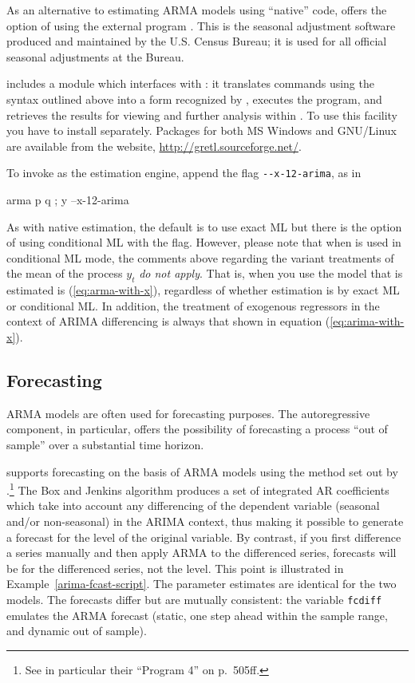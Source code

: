 As an alternative to estimating ARMA models using ``native'' code,
 offers the option of using the external program
.  This is the seasonal adjustment software produced
and maintained by the U.S. Census Bureau; it is used for all official
seasonal adjustments at the Bureau.

 includes a module which interfaces with :
it translates  commands using the syntax outlined above into
a form recognized by , executes the program, and
retrieves the results for viewing and further analysis within
.  To use this facility you have to install
 separately.  Packages for both MS Windows and
GNU/Linux are available from the  website,
\url{http://gretl.sourceforge.net/}.

To invoke  as the estimation engine, append the flag
\verb|--x-12-arima|, as in
\begin{code}
arma p q ; y --x-12-arima
\end{code}
As with native estimation, the default is to use exact ML but there is
the option of using conditional ML with the  flag.
However, please note that when  is used in conditional
ML mode, the comments above regarding the variant treatments of the
mean of the process $y_t$ \textit{do not apply}.  That is, when you
use  the model that is estimated is
(\ref{eq:arma-with-x}), regardless of whether estimation is by exact
ML or conditional ML.  In addition, the treatment of exogenous
regressors in the context of ARIMA differencing is always that shown
in equation (\ref{eq:arima-with-x}).


\subsection{Forecasting}
\label{arma-fcast}

ARMA models are often used for forecasting purposes.  The
autoregressive component, in particular, offers the possibility of
forecasting a process ``out of sample'' over a substantial time
horizon.

 supports forecasting on the basis of ARMA models using the
method set out by \cite{box-jenkins76}.\footnote{See in particular
  their ``Program 4'' on p.\ 505ff.}  The Box and Jenkins algorithm
produces a set of integrated AR coefficients which take into account
any differencing of the dependent variable (seasonal and/or
non-seasonal) in the ARIMA context, thus making it possible to
generate a forecast for the level of the original variable.  By
contrast, if you first difference a series manually and then apply
ARMA to the differenced series, forecasts will be for the differenced
series, not the level.  This point is illustrated
in Example~\ref{arima-fcast-script}.  The parameter estimates are identical
for the two models.  The forecasts differ but are mutually consistent:
the variable \texttt{fcdiff} emulates the ARMA forecast (static,
one step ahead within the sample range, and dynamic out of sample).

